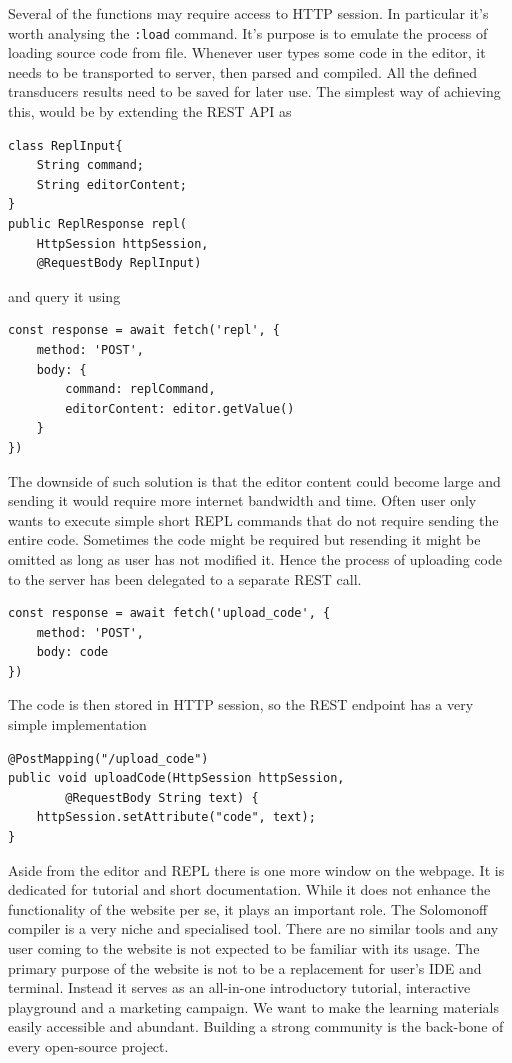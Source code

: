 Several of the functions may require access to HTTP session. In particular it's worth analysing the \texttt{:load} command. It's purpose is to emulate the process of loading source code from file. Whenever user types some code in the editor, it needs to be transported to server, then parsed and compiled. All the defined transducers results need to be saved for later use. The simplest way of achieving this, would be by extending the REST API as
\begin{lstlisting}
class ReplInput{
	String command;
	String editorContent;
}
public ReplResponse repl(
    HttpSession httpSession, 
    @RequestBody ReplInput)
\end{lstlisting}
and query it using
\begin{lstlisting}
const response = await fetch('repl', {
    method: 'POST',
    body: {
        command: replCommand,
        editorContent: editor.getValue()
    }
})
\end{lstlisting}
The downside of such solution is that the editor content could become large and sending it would require more internet bandwidth and time. Often user only wants to execute simple short REPL commands that do not require sending the entire code. Sometimes the code might be required but resending it might be omitted as long as user has not modified it. Hence the process of uploading code to the server has been delegated to a separate REST call.
\begin{lstlisting}
const response = await fetch('upload_code', {
	method: 'POST',
	body: code
})
\end{lstlisting}
The code is then stored in HTTP session, so the REST endpoint has a very simple implementation
\begin{lstlisting}
@PostMapping("/upload_code")
public void uploadCode(HttpSession httpSession, 
        @RequestBody String text) {
    httpSession.setAttribute("code", text);
}
\end{lstlisting}


Aside from the editor and REPL there is one more window on the webpage. It is dedicated for tutorial and short documentation.  While it does not enhance the functionality of the website per se, it plays an important role. The Solomonoff compiler is a very niche and specialised tool. There are no similar tools and any user coming to the website is not expected to be familiar with its usage. The primary purpose of the website is not to be a replacement for user's IDE and terminal. Instead it serves as an all-in-one introductory tutorial, interactive playground and a marketing campaign. We want to make the learning materials easily accessible and abundant. Building a strong community is the back-bone of every open-source project. 


